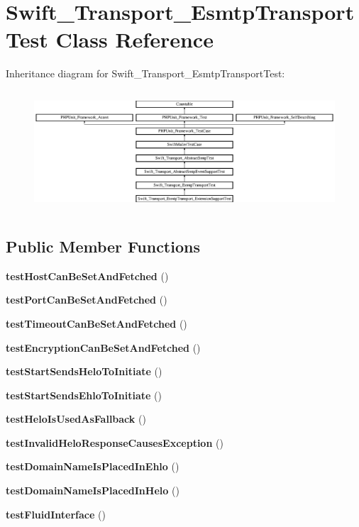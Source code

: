 \section{Swift\+\_\+\+Transport\+\_\+\+Esmtp\+Transport\+Test Class Reference}
\label{class_swift___transport___esmtp_transport_test}
Inheritance diagram for Swift\+\_\+\+Transport\+\_\+\+Esmtp\+Transport\+Test\+:\begin{figure}[H]
\begin{center}
\leavevmode
\includegraphics[height=4.525252cm]{class_swift___transport___esmtp_transport_test}
\end{center}
\end{figure}
\subsection*{Public Member Functions}
\begin{DoxyCompactItemize}
\item 
{\bf test\+Host\+Can\+Be\+Set\+And\+Fetched} ()
\item 
{\bf test\+Port\+Can\+Be\+Set\+And\+Fetched} ()
\item 
{\bf test\+Timeout\+Can\+Be\+Set\+And\+Fetched} ()
\item 
{\bf test\+Encryption\+Can\+Be\+Set\+And\+Fetched} ()
\item 
{\bf test\+Start\+Sends\+Helo\+To\+Initiate} ()
\item 
{\bf test\+Start\+Sends\+Ehlo\+To\+Initiate} ()
\item 
{\bf test\+Helo\+Is\+Used\+As\+Fallback} ()
\item 
{\bf test\+Invalid\+Helo\+Response\+Causes\+Exception} ()
\item 
{\bf test\+Domain\+Name\+Is\+Placed\+In\+Ehlo} ()
\item 
{\bf test\+Domain\+Name\+Is\+Placed\+In\+Helo} ()
\item 
{\bf test\+Fluid\+Interface} ()
\end{DoxyCompactItemize}
